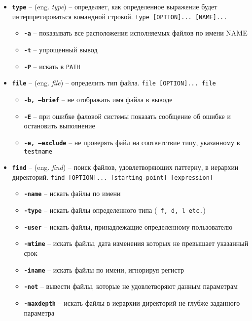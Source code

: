\documentclass[12pt, a4paper]{article}
\begin{document}
\begin{itemize}
  \item \textbf{\texttt{type}} -- (eng. \textit{type}) -- определяет, как
    определенное выражение будет интерпретироваться командной строкой.
    \texttt{type [OPTION]... [NAME]...}
  \begin{itemize}
    \item \textbf{\texttt{-a}} -- показывать все расположения исполняемых
      файлов по имени NAME
    \item \textbf{\texttt{-t}} -- упрощенный вывод
    \item \textbf{\texttt{-P}} -- искать в \texttt{PATH}
  \end{itemize}
  \item \textbf{\texttt{file}} -- (eng. \textit{file}) -- определить тип файла.
    \texttt{file [OPTION]... file}
  \begin{itemize}
    \item \textbf{\texttt{-b, --brief}} -- не отображать имя файла в выводе
    \item \textbf{\texttt{-E}} -- при ошибке фаловой системы показать сообщение
      об ошибке и остановить выполнение
    \item \textbf{\texttt{-e, --exclude}} -- не проверять файл на соответствие
      типу, указанному в \texttt{testname}
  \end{itemize}
  \item \textbf{\texttt{find}} -- (eng. \textit{find}) -- поиск файлов,
  удовлетворяющих паттерну, в иерархии директорий. \texttt{find [OPTION]...
  [starting-point] [expression]}
  \begin{itemize}
    \item \textbf{\texttt{-name}} -- искать файлы по имени
    \item \textbf{\texttt{-type}} -- искать файлы определенного типа (\texttt{
      f, d, l etc.})
    \item \textbf{\texttt{-user}} -- искать файлы, принадлежащие определенному
     пользователю
    \item \textbf{\texttt{-mtime}} -- искать файлы, дата изменения которых не
     превышает указанный срок
    \item \textbf{\texttt{-iname}} -- искать файлы по имени, игнорируя регистр
    \item \textbf{\texttt{-not}} -- вывести файлы, которые не удовлетворяют
      данным параметрам
    \item \textbf{\texttt{-maxdepth}} -- искать файлы в иерархии директорий не
      глубже заданного параметра

\end{itemize}
\end{itemize}
\end{document}
